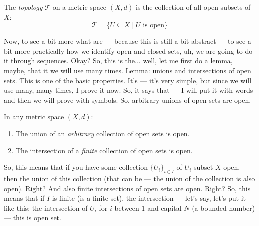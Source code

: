 \begin{math-stroke}
\begin{definition}[Topology]\label{def:topology}
The \emph{topology} $\mathcal{T}$ on a metric space $(X, d)$ is the collection of all open subsets of $X$:
\[ \mathcal{T} = \{ U \subseteq X \mid U \text{ is open} \} \]
\end{definition}
\end{math-stroke}


\begin{spoken-clean}[00:12:03 - 00:13:41]
Now, to see a bit more what are --- because this is still a bit abstract --- to see a bit more practically how we identify open and closed sets, uh, we are going to do it through sequences. Okay? So, this is the... well, let me first do a lemma, maybe, that it we will use many times. Lemma: unions and intersections of open sets. This is one of the basic properties. It's --- it's very simple, but since we will use many, many times, I prove it now. So, it says that --- I will put it with words and then we will prove with symbols. So, arbitrary unions of open sets are open.
\end{spoken-clean}

\begin{nice-box}
\setcounter{theorem}{42}
\begin{proposition}\label{prop:open-sets-unions-intersections}
In any metric space $(X, d)$:
\begin{enumerate}
    \setcounter{enumi}{0} \item The union of an \emph{arbitrary} collection of open sets is open.
    \setcounter{enumi}{1} \item The intersection of a \emph{finite} collection of open sets is open.
\end{enumerate}
\end{proposition}
\end{nice-box}

\begin{spoken-clean}[00:13:41 - 00:15:50]
So, this means that if you have some collection $\{U_i\}_{i \in I}$ of $U_i$ subset $X$ open, then the union of this collection (that can be --- the union of the collection is also open). Right? And also finite intersections of open sets are open. Right? So, this means that if $I$ is finite (is a finite set), the intersection --- let's say, let's put it like this: the intersection of $U_i$ for $i$ between $1$ and capital $N$ (a bounded number) --- this is open set.
\end{spoken-clean}

